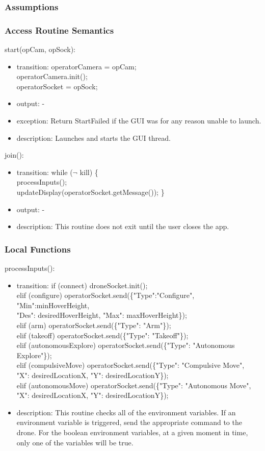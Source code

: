 \documentclass[12pt, titlepage]{article}
\begin{document}
\subsubsection{Assumptions}
\subsubsection{Access Routine Semantics}
\noindent start(opCam, opSock):
\begin{itemize}
\item transition: operatorCamera = opCam; \\
operatorCamera.init();\\
operatorSocket = opSock;
\item output: -
\item exception: Return StartFailed if the GUI was for any reason unable to launch. 
\item description: Launches and starts the GUI thread.  
\end{itemize}
\noindent join():
\begin{itemize}
\item transition: while ($\neg$ kill) \{ \\ processInputs(); \\ updateDisplay(operatorSocket.getMessage()); \}
\item output: -
\item description: This routine does not exit until the user closes the app.  
\end{itemize}
\subsubsection{Local Functions}
\noindent processInputs():
\begin{itemize}
\item transition:
if (connect) droneSocket.init();\\
elif (configure) operatorSocket.send(\{"Type":"Configure", "Min":minHoverHeight, \\"Des": desiredHoverHeight, "Max": maxHoverHeight\});\\
 elif (arm) operatorSocket.send(\{"Type": "Arm"\});\\
 elif (takeoff) operatorSocket.send(\{"Type": "Takeoff"\});\\
 elif (autonomousExplore) operatorSocket.send(\{"Type": "Autonomous Explore"\});\\
 elif (compulsiveMove) operatorSocket.send(\{"Type": "Compulsive Move", \\ "X": desiredLocationX, "Y": desiredLocationY\});\\
 elif (autonomousMove) operatorSocket.send(\{"Type": "Autonomous Move", \\ "X": desiredLocationX, "Y": desiredLocationY\});\\
\item description: This routine checks all of the environment variables. If an environment variable is triggered, send the appropriate command to the drone. For the boolean environment variables, at a given moment in time, only one of the variables will be true.
\end{itemize}
\end{document}
